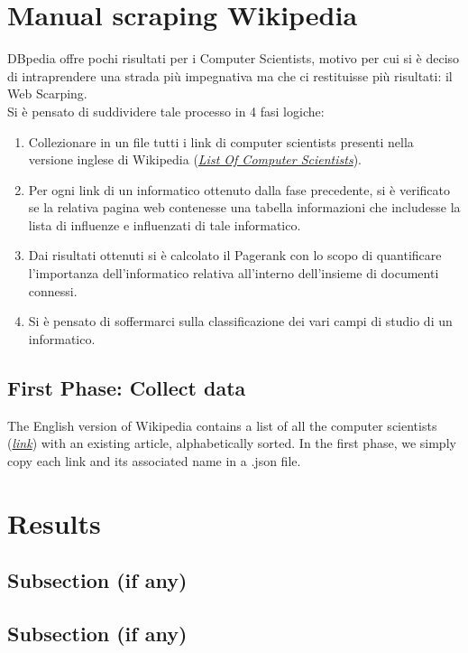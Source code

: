 \documentclass[12pt, twoside]{article}
\begin{document}
\section{Manual scraping Wikipedia}
DBpedia offre pochi risultati per i Computer Scientists, motivo per cui si è deciso di intraprendere una strada più impegnativa ma che ci restituisse più risultati: il Web Scarping.\\
Si è pensato di suddividere tale processo in 4 fasi logiche:
\begin{enumerate}[noitemsep, topsep=1pt]
	\item Collezionare in un file tutti i link di computer scientists presenti nella versione inglese di Wikipedia (\textit{\href{https://en.wikipedia.org/wiki/List_of_computer_scientists}{List Of Computer Scientists}}).
	\item Per ogni link di un informatico ottenuto dalla fase precedente, si è verificato se la relativa pagina web contenesse una tabella informazioni che includesse la lista di influenze e influenzati di tale informatico.
	\item Dai risultati ottenuti si è calcolato il Pagerank con lo scopo di quantificare l'importanza dell'informatico relativa all'interno dell'insieme di documenti connessi.
	\item Si è pensato di soffermarci sulla classificazione dei vari campi di studio di un informatico.
\end{enumerate}

\subsection{First Phase: Collect data}
The English version of Wikipedia contains a list of all the computer scientists (\textit{\href{https://en.wikipedia.org/wiki/List_of_computer_scientists}{link}}) with an existing article, alphabetically sorted. In the first phase, we simply copy each link and its associated name in a .json file.


\newpage
\section{Results}
\lipsum[1] %
\subsection{Subsection (if any)}
\lipsum %
\subsection{Subsection (if any)}
\lipsum %
\end{document}
